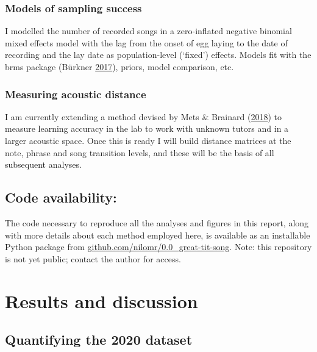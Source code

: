 \documentclass[]{report}
\begin{document}
\hypertarget{models-of-sampling-success}{%
\subsection{Models of sampling
success}\label{models-of-sampling-success}}

I modelled the number of recorded songs in a zero-inflated negative
binomial mixed effects model with the lag from the onset of egg laying
to the date of recording and the lay date as population-level (`fixed')
effects. Models fit with the brms package (Bürkner
\protect\hyperlink{ref-Burkner2017a}{2017}), priors, model comparison,
etc.

\hypertarget{measuring-acoustic-distance}{%
\subsection{Measuring acoustic
distance}\label{measuring-acoustic-distance}}

I am currently extending a method devised by Mets \& Brainard
(\protect\hyperlink{ref-Mets2018}{2018}) to measure learning accuracy in
the lab to work with unknown tutors and in a larger acoustic space. Once
this is ready I will build distance matrices at the note, phrase and
song transition levels, and these will be the basis of all subsequent
analyses.

\hypertarget{code-availability}{%
\section{Code availability:}\label{code-availability}}

The code necessary to reproduce all the analyses and figures in this
report, along with more details about each method employed here, is
available as an installable Python package from
\href{https://github.com/nilomr/0.0_great-tit-song}{github.com/nilomr/0.0\_great-tit-song}.
Note: this repository is not yet public; contact the author for access.

\hypertarget{results-and-discussion}{%
\chapter{Results and discussion}\label{results-and-discussion}}

\hypertarget{quantifying-the-2020-dataset}{%
\section{Quantifying the 2020
dataset}\label{quantifying-the-2020-dataset}}
\end{document}
